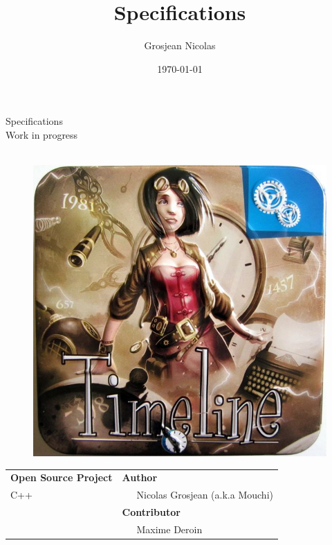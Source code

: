 \documentclass[12pt,a4paper,twoside]{article}
\title{Specifications}
\author{Grosjean Nicolas}
\date{\today}
\begin{document}
\lstset{ numbers=left, tabsize=3, frame=single, numberstyle=\ttfamily, basicstyle=\footnotesize} 
\thispagestyle{empty}

\begin{center}
\vspace{3cm}
{\LARGE Specifications}\\
\vspace{1cm}
Work in progress\\
\vspace{2cm}
\\
\vspace{1cm}
\FloatBarrier
\begin{figure}[ht]
\centering 
\includegraphics[scale=0.5]{Images/Timeline.png}
\end{figure}
\FloatBarrier
\vspace{1cm}
\begin{tabular}{p{10cm}p{10cm}}
{\bf Open Source Project}                                            &{\bf Author}\\
{\footnotesize C++}       & ~~~Nicolas Grosjean (a.k.a Mouchi)\\
{\footnotesize }                                        & {\bf Contributor}\\
{\footnotesize }                          & ~~~Maxime Deroin
\end{tabular}
\end{center}
\end{document}

